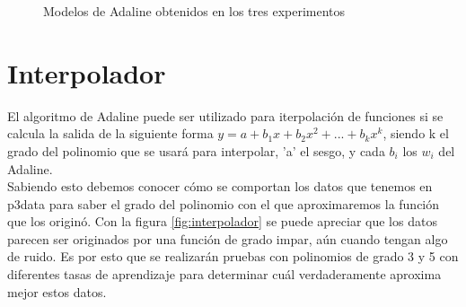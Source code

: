 \documentclass[a4paper]{article}
\begin{document}
		\begin{figure}[H]
		\centering
		\caption{Modelos de Adaline obtenidos en los tres experimentos}
		\label{f:adaline}
		\end{figure}
	
\section{Interpolador}
	El algoritmo de Adaline puede ser utilizado para iterpolación de funciones si se calcula la salida de la siguiente forma $y = a + b_{1}x + b_{2}x^{2} + ... + b_{k}x^{k}$, siendo k el grado del polinomio que se usará para interpolar, 'a'  el sesgo, y cada $b_{i}$ los $w_{i}$ del Adaline.\\
	
	Sabiendo esto debemos conocer cómo se comportan los datos que tenemos en p3data para saber el grado del polinomio con el que aproximaremos la función que los originó. Con la figura \ref{fig:interpolador} se puede apreciar que los datos parecen ser originados por una función de grado impar, aún cuando tengan algo de ruido. Es por esto que se realizarán pruebas con polinomios de grado 3 y 5 con diferentes tasas de aprendizaje para determinar cuál verdaderamente aproxima mejor estos datos.
	
\end{document}
